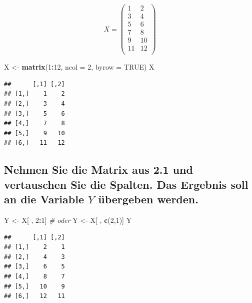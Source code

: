 \documentclass[12pt,a4paper]{article}
\newenvironment{Shaded}{\begin{snugshade}}{\end{snugshade}}
\newcommand{\AttributeTok}[1]{\textcolor[rgb]{0.13,0.29,0.53}{#1}}
\newcommand{\CommentTok}[1]{\textcolor[rgb]{0.56,0.35,0.01}{\textit{#1}}}
\newcommand{\ConstantTok}[1]{\textcolor[rgb]{0.56,0.35,0.01}{#1}}
\newcommand{\DecValTok}[1]{\textcolor[rgb]{0.00,0.00,0.81}{#1}}
\newcommand{\FunctionTok}[1]{\textcolor[rgb]{0.13,0.29,0.53}{\textbf{#1}}}
\newcommand{\NormalTok}[1]{#1}
\newcommand{\OtherTok}[1]{\textcolor[rgb]{0.56,0.35,0.01}{#1}}
\newcommand{\SpecialCharTok}[1]{\textcolor[rgb]{0.81,0.36,0.00}{\textbf{#1}}}
\begin{document}
\[ X = \begin{pmatrix} 1 & 2 \\ 3 & 4\\ 5 & 6 \\ 7 & 8 \\
9 & 10 \\ 11 & 12 \\\end{pmatrix}\]

\begin{Shaded}
\begin{Highlighting}[]
\NormalTok{    X }\OtherTok{\textless{}{-}} \FunctionTok{matrix}\NormalTok{(}\DecValTok{1}\SpecialCharTok{:}\DecValTok{12}\NormalTok{, }\AttributeTok{ncol =} \DecValTok{2}\NormalTok{, }\AttributeTok{byrow =} \ConstantTok{TRUE}\NormalTok{)}
\NormalTok{    X}
\end{Highlighting}
\end{Shaded}

\begin{verbatim}
##      [,1] [,2]
## [1,]    1    2
## [2,]    3    4
## [3,]    5    6
## [4,]    7    8
## [5,]    9   10
## [6,]   11   12
\end{verbatim}

\vspace{0.5cm}

\subsection{\texorpdfstring{Nehmen Sie die Matrix aus 2.1 und
vertauschen Sie die Spalten. Das Ergebnis soll an die Variable \(Y\)
übergeben
werden.}{Nehmen Sie die Matrix aus 2.1 und vertauschen Sie die Spalten. Das Ergebnis soll an die Variable Y übergeben werden.}}\label{nehmen-sie-die-matrix-aus-2.1-und-vertauschen-sie-die-spalten.-das-ergebnis-soll-an-die-variable-y-uxfcbergeben-werden.}

\begin{Shaded}
\begin{Highlighting}[]
\NormalTok{    Y }\OtherTok{\textless{}{-}}\NormalTok{ X[ , }\DecValTok{2}\SpecialCharTok{:}\DecValTok{1}\NormalTok{] }\CommentTok{\# oder}
\NormalTok{    Y }\OtherTok{\textless{}{-}}\NormalTok{ X[ , }\FunctionTok{c}\NormalTok{(}\DecValTok{2}\NormalTok{,}\DecValTok{1}\NormalTok{)]}
\NormalTok{    Y}
\end{Highlighting}
\end{Shaded}

\begin{verbatim}
##      [,1] [,2]
## [1,]    2    1
## [2,]    4    3
## [3,]    6    5
## [4,]    8    7
## [5,]   10    9
## [6,]   12   11
\end{verbatim}
\end{document}

